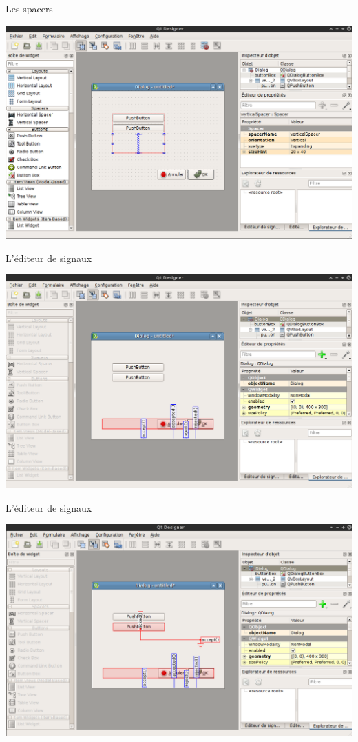 \documentclass{beamer}
\begin{document}
\begin{frame}[fragile]{Les spacers}
 \begin{center}
  \includegraphics[scale=0.30]{Layoutavecspacer.png}
 \end{center}
\end{frame}

\begin{frame}[fragile]{L'éditeur de signaux}
 \begin{center}
  \includegraphics[scale=0.30]{Signaux1.png}
 \end{center}
\end{frame}

\begin{frame}[fragile]{L'éditeur de signaux}
 \begin{center}
  \includegraphics[scale=0.30]{Signaux2.png}
 \end{center}
\end{frame}
\end{document}

